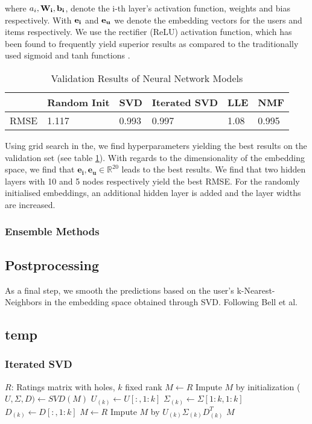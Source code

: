 \documentclass[10pt,conference,compsocconf]{IEEEtran}
\begin{document}
where $a_i,\bf{W_i}, \bf{b_i}$, denote the i-th layer's activation function, weights and bias respectively. With $\bf{e_i}$ and $\bf{e_u}$ we denote the embedding vectors for the users and items respectively. We use the rectifier (ReLU) activation function, which has been found to frequently yield superior results as compared to the traditionally used sigmoid and tanh functions \cite{glorot2011deep}.


\begin{table}[ht]
\centering
\caption{Validation Results of Neural Network Models}
\label{table:neural_net_models}
\begin{tabular}{|l|l|l|l|l|l|}
\hline
     & Random Init & SVD & Iterated SVD & LLE & NMF \\ \hline
RMSE & 1.117           & 0.993   & 0.997           & 1.08   & 0.995   \\ \hline
\end{tabular}
\end{table}

Using grid search in the, we find hyperparameters yielding the best results on the validation set (see table \ref{table:neural_net_models}). 
With regards to the dimensionality of the embedding space, we find that $\mathbf{e_i}, \mathbf{e_u} \in  \mathbb{R}^{20}$ leads to the best results. We find that two hidden layers with 10 and 5 nodes respectively yield the best RMSE. For the randomly initialised embeddings, an additional hidden layer is added and the layer widths are increased.




\subsubsection{Ensemble Methods}

\subsection{Postprocessing}
As a final step, we smooth the predictions based on the user's  k-Nearest-Neighbors in the embedding space obtained through SVD. Following Bell et al. \cite{bell2007improved}

\subsection{temp}
\subsubsection{Iterated SVD}
\begin{algorithmic}
	\STATE $R$: Ratings matrix with holes, $k$ fixed rank
	\STATE $M \leftarrow R$
	\STATE Impute $M$ by initialization
    	\STATE ($U, \Sigma, D) \leftarrow SVD(M)$
    	\STATE $U_{(k)} \leftarrow U[:, 1:k]$
    	\STATE $\Sigma_{(k)} \leftarrow \Sigma[1:k, 1:k]$
    	\STATE $D_{(k)} \leftarrow D[:, 1:k]$
    	\STATE $M \leftarrow R$
    	\STATE Impute $M$ by $U_{(k)} \Sigma_{(k)} D_{(k)}^T$
    \ENDFOR
    \RETURN $M$
\end{algorithmic}
\end{document}
